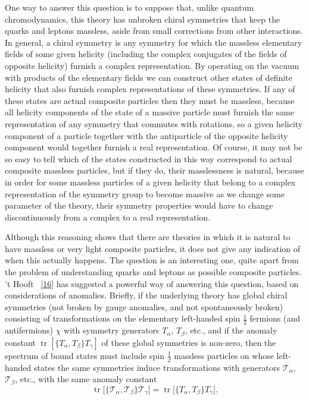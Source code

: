 One way to answer this question is to suppose that, unlike quantum
chromodynamics, this theory has unbroken chiral symmetries that keep the
quarks and leptons massless, aside from small corrections from other
interactions. In general, a chiral symmetry is any symmetry for which the
massless elementary fields of some given helicity (including the complex
conjugates of the fields of opposite helicity) furnish a complex
representation. By operating on the vacuum with products of the elementary
fields we can construct other states of definite helicity that also furnish
complex representations of these symmetries. If any of these states are
actual composite particles then they must be massless, because all
helicity components of the state of a massive particle must furnish the
same representation of any symmetry that commutes with rotations, so a
given helicity component of a particle together with the antiparticle of
the opposite helicity component would together furnish a real
representation. Of course, it may not be so easy to tell which of the
states constructed in this way correspond to actual composite massless
particles, but if they do, their masslessness is natural, because in order
for some massless particles of a given helicity that belong to a complex
representation of the symmetry group to become massive as we change some
parameter of the theory, their symmetry properties would have to change
discontinuously from a complex to a real representation.

Although this reasoning shows that there are theories in which it is
natural to have massless or very light composite particles, it does not
give any indication of when this actually happens. The question is an
interesting one, quite apart from the problem of understanding quarks and
leptons as possible composite particles. 't Hooft~%
\hyperref[ch22-ref-16]{[16]} has suggested a powerful way of answering
this question, based on considerations of anomalies. Briefly, if the
underlying theory has global chiral symmetries (not broken by gauge
anomalies, and not spontaneously broken) consisting of transformations on
the elementary left-handed spin $\frac12$ fermions (and antifermions)
$\chi$ with symmetry generators $T_\alpha$, $T_\beta$, etc., and if the
anomaly constant
$\operatorname{tr}[\{T_\alpha,T_\beta\}T_\gamma]$ of these global
symmetries is non-zero, then the spectrum of bound states must include
spin $\frac12$ massless particles on whose left-handed states the same
symmetries induce transformations with generators $\mathcal T_\alpha$,
$\mathcal T_\beta$, etc., with the same anomaly constant
\begin{equation}
 \operatorname{tr}
 \bigl[\{\mathcal T_\alpha,\mathcal T_\beta\}\mathcal T_\gamma\bigr]
 =
 \operatorname{tr}\bigl[\{T_\alpha,T_\beta\}T_\gamma\bigr].
 \tag{22.5.1}\label{eq:22.5.1}
\end{equation}

